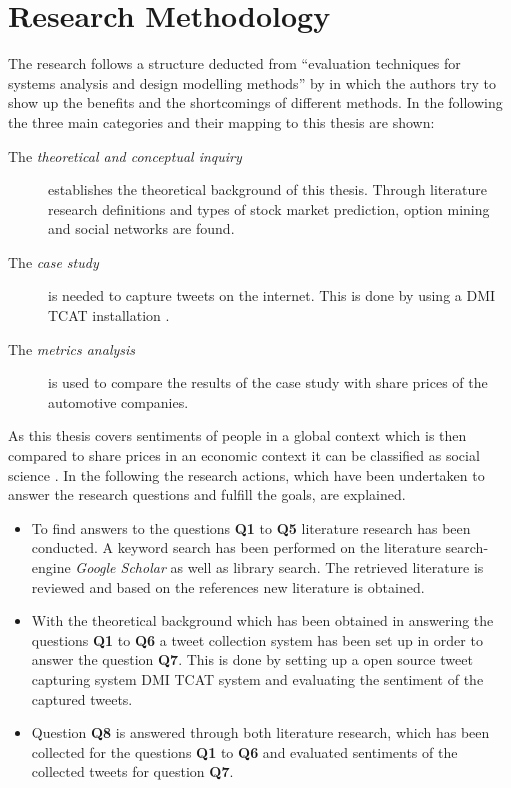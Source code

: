 \section{Research Methodology}
\label{s:introduction-researchmethodology}

The research follows a structure deducted from ``evaluation techniques for systems analysis and design modelling methods'' by \citet{Siau2011} in which the authors try to show up the benefits and the shortcomings of different methods.
In the following the three main categories and their mapping to this thesis are shown:

\begin{description}
	\item[The \emph{theoretical and conceptual inquiry}] {
		establishes the theoretical background of this thesis.
		Through literature research definitions and types of stock market prediction, option mining and social networks are found.
	}
	
	\item[The \emph{case study}] {
		is needed to capture tweets on the internet.
		This is done by using a DMI TCAT installation
		\citep{Borra2014}.
	}
	
	\item[The \emph{metrics analysis}] {
		is used to compare the results of the case study with share prices of the automotive companies.
	}
\end{description}

As this thesis covers sentiments of people in a global context which is then compared to share prices in an economic context it can be classified as social science \citep{Recker2013}.
In the following the research actions, which have been undertaken to answer the research questions and fulfill the goals, are explained.

\begin{itemize}
	\item To find answers to the questions \textbf{Q1} to \textbf{Q5} literature research has been conducted.
	A keyword search has been performed on the literature search-engine \emph{Google Scholar} as well as library search.
	The retrieved literature is reviewed and based on the references new literature is obtained.
	
	\item With the theoretical background which has been obtained in answering the questions \textbf{Q1} to \textbf{Q6} a tweet collection system has been set up in order to answer the question \textbf{Q7}.
	This is done by setting up a open source tweet capturing system DMI TCAT system and evaluating the sentiment of the captured tweets.
	
	\item Question \textbf{Q8} is answered through both literature research, which has been collected for the questions \textbf{Q1} to \textbf{Q6} and evaluated sentiments of the collected tweets for question \textbf{Q7}.
\end{itemize}

